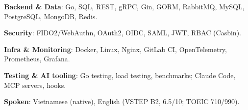 \begin{cvempty} %
    \begin{cvitems} %
        \item{\textbf{Backend \& Data}: Go, SQL, REST, gRPC, Gin, GORM, RabbitMQ, MySQL, PostgreSQL, MongoDB, Redis.}
        \item{\textbf{Security}: FIDO2/WebAuthn, OAuth2, OIDC, SAML, JWT, RBAC (Casbin).}
        \item{\textbf{Infra \& Monitoring}: Docker, Linux, Nginx, GitLab CI, OpenTelemetry, Prometheus, Grafana.}
        \item{\textbf{Testing \& AI tooling}: Go testing, load testing, benchmarks; Claude Code, MCP servers, hooks.}
        \item{\textbf{Spoken}: Vietnamese (native), English (VSTEP B2, 6.5/10; TOEIC 710/990).}
    \end{cvitems}
\end{cvempty}
